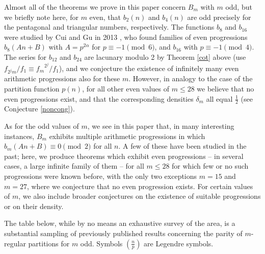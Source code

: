 \documentclass[12pt]{amsart}
\theoremstyle{definition}
\begin{document}
Almost all of the theorems we prove in this paper concern $B_m$ with $m$ odd, but we briefly note here, for $m$ even, that $b_2(n)$ and $b_4(n)$ are odd precisely for the pentagonal and triangular numbers, respectively. The functions $b_8$ and $b_{16}$ were studied by Cui and Gu in 2013 \cite{CuiGu}, who found families of even progressions $b_8(An+B)$ with $A = p^{2\alpha}$ for $p \equiv -1 \pmod{6}$, and $b_{16}$ with $p \equiv -1 \pmod{4}$.  The series for $b_{12}$ and $b_{24}$ are lacunary modulo 2 by Theorem \ref{cot} above (use $f_{2^j m}/f_1 \equiv {f_m}^{2^j}/f_1$), and we conjecture the existence of infinitely many even arithmetic progressions also for these $m$. However, in analogy to the case of the partition function $p(n)$, for all other even values of $m \leq 28$ we believe that no even progressions exist, and that the corresponding densities $\delta_m$ all equal $\frac{1}{2}$ (see Conjecture \ref{noncong}).

As for the odd values of $m$, we see in this paper that, in many interesting instances, $B_m$ exhibits multiple arithmetic progressions in which $b_m(An+B) \equiv 0 \pmod{2}$ for all $n$.  A few of these have been studied in the past; here, we produce theorems which exhibit even progressions -- in several cases, a large infinite family of them -- for all $m\le 28$ for which few or no such progressions were known before, with the only two exceptions $m=15$ and $m=27$, where we conjecture that no even progression exists. For certain values of $m$, we also include broader conjectures on the existence of suitable progressions or on their density.

The table below, while by no means an exhaustive survey of the area, is a substantial sampling of previously published results concerning the parity of $m$-regular partitions for $m$ odd.  Symbols $(\frac{n}{p})$ are Legendre symbols.
\end{document}
